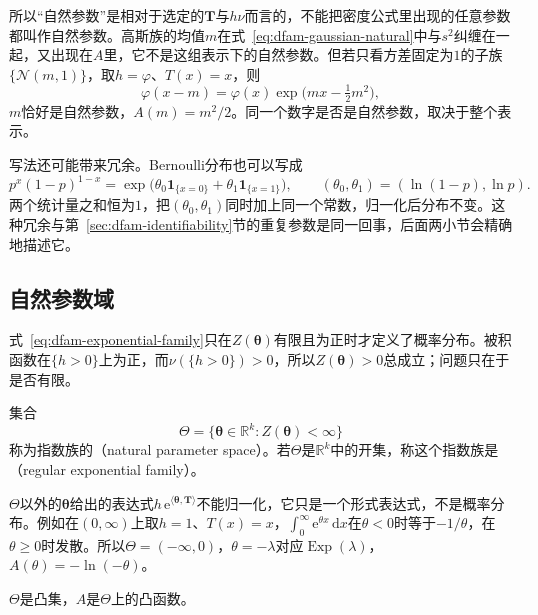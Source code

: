 所以“自然参数”是相对于选定的$\bm{T}$与$h\nu$而言的，不能把密度公式里出现的任意参数都叫作自然参数。高斯族的均值$m$在式~\eqref{eq:dfam-gaussian-natural}中与$s^{2}$纠缠在一起，又出现在$A$里，它不是这组表示下的自然参数。但若只看方差固定为$1$的子族$\{\mathcal{N}(m,1)\}$，取$h=\varphi$、$T(x)=x$，则
\[
  \varphi(x-m)=\varphi(x)\exp\bigl(mx-\tfrac12m^{2}\bigr),
\]
$m$恰好是自然参数，$A(m)=m^{2}/2$。同一个数字是否是自然参数，取决于整个表示。

写法还可能带来冗余。Bernoulli分布也可以写成
\[
  p^{x}(1-p)^{1-x}=\exp\bigl(\theta_0\mathbf{1}_{\{x=0\}}+\theta_1\mathbf{1}_{\{x=1\}}\bigr),\qquad(\theta_0,\theta_1)=(\ln(1-p),\ln p).
\]
两个统计量之和恒为$1$，把$(\theta_0,\theta_1)$同时加上同一个常数，归一化后分布不变。这种冗余与第~\ref{sec:dfam-identifiability}节的重复参数是同一回事，后面两小节会精确地描述它。

\subsection{自然参数域}
\label{sec:dfam-natural-domain}

式~\eqref{eq:dfam-exponential-family}只在$Z(\bm{\theta})$有限且为正时才定义了概率分布。被积函数在$\{h>0\}$上为正，而$\nu(\{h>0\})>0$，所以$Z(\bm{\theta})>0$总成立；问题只在于是否有限。

\begin{definition}[自然参数域]
\label{def:dfam-natural-domain}
集合
\begin{equation}
  \Theta=\{\bm{\theta}\in\mathbb{R}^{k}:Z(\bm{\theta})<\infty\}
  \label{eq:dfam-natural-domain}
\end{equation}
称为指数族的（natural parameter space）。若$\Theta$是$\mathbb{R}^{k}$中的开集，称这个指数族是（regular exponential family）。
\end{definition}

$\Theta$以外的$\bm{\theta}$给出的表达式$h\,\mathrm{e}^{\langle\bm{\theta},\bm{T}\rangle}$不能归一化，它只是一个形式表达式，不是概率分布。例如在$(0,\infty)$上取$h=1$、$T(x)=x$，$\int_0^\infty\mathrm{e}^{\theta x}\,\mathrm{d}x$在$\theta<0$时等于$-1/\theta$，在$\theta\geq0$时发散。所以$\Theta=(-\infty,0)$，$\theta=-\lambda$对应$\operatorname{Exp}(\lambda)$，$A(\theta)=-\ln(-\theta)$。

\begin{lemma}[自然参数域的凸性]
\label{lem:dfam-domain-convex}
$\Theta$是凸集，$A$是$\Theta$上的凸函数。
\end{lemma}

